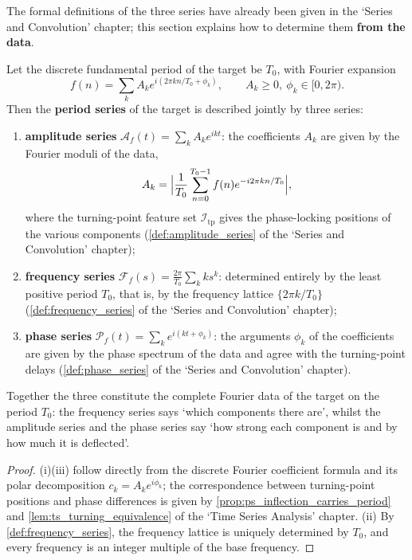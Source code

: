 The formal definitions of the three series have already been given in the `Series and Convolution' chapter; this section explains how to determine them \textbf{from the data}.

\begin{theorem}\label{thm:ps_series_reconstruction}
Let the discrete fundamental period of the target be $T_0$, with Fourier expansion
\[
f(n)=\sum_{k}A_ke^{i(2\pi kn/T_0+\phi_k)},\qquad A_k\ge0,\ \phi_k\in[0,2\pi).
\]
Then the \textbf{period series} of the target is described jointly by three series:
\begin{enumerate}[label=(\roman*)]
    \item \textbf{amplitude series} $\mathcal{A}_f(t)=\sum_kA_ke^{ikt}$: the coefficients $A_k$ are given by the Fourier moduli of the data,
    \[
    A_k=\Bigl|\frac1{T_0}\sum_{n=0}^{T_0-1}f(n)e^{-i2\pi kn/T_0}\Bigr|,
    \]
    where the turning-point feature set $\mathcal{I}_{\mathrm{tp}}$ gives the phase-locking positions of the various components (\cref{def:amplitude_series} of the `Series and Convolution' chapter);
    \item \textbf{frequency series} $\mathcal{F}_f(s)=\frac{2\pi}{T_0}\sum_k ks^k$: determined entirely by the least positive period $T_0$, that is, by the frequency lattice $\{2\pi k/T_0\}$ (\cref{def:frequency_series} of the `Series and Convolution' chapter);
    \item \textbf{phase series} $\mathcal{P}_f(t)=\sum_ke^{i(kt+\phi_k)}$: the arguments $\phi_k$ of the coefficients are given by the phase spectrum of the data and agree with the turning-point delays (\cref{def:phase_series} of the `Series and Convolution' chapter).
\end{enumerate}
Together the three constitute the complete Fourier data of the target on the period $T_0$: the frequency series says `which components there are', whilst the amplitude series and the phase series say `how strong each component is and by how much it is deflected'.
\end{theorem}

\begin{proof}
(i)(iii) follow directly from the discrete Fourier coefficient formula and its polar decomposition $c_k=A_ke^{i\phi_k}$; the correspondence between turning-point positions and phase differences is given by \cref{prop:ps_inflection_carries_period} and \cref{lem:ts_turning_equivalence} of the `Time Series Analysis' chapter.
(ii) By \cref{def:frequency_series}, the frequency lattice is uniquely determined by $T_0$, and every frequency is an integer multiple of the base frequency.
\end{proof}

